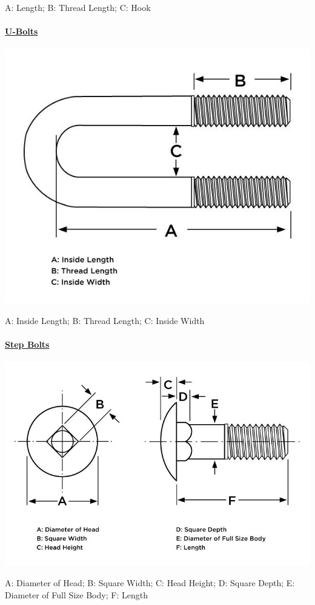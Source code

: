 \documentclass[12pt, a4paper]{article}
\let\oldparagraph\paragraph
\renewcommand{\paragraph}[1]{\oldparagraph{#1}\mbox{}}
\begin{document}
		\hypertarget{i9y9v8n}{}
		A: Length; B: Thread Length; C: Hook
		
		\hypertarget{iob5e0i}{}
		\hypertarget{in9zoqf}{%
			\paragraph{\texorpdfstring{\href{https://www.huyett.com/all-products/bolts/u-bolts}{U-Bolts}}{U-Bolts}}\label{in9zoqf}}
		
		\includegraphics{Introduction to Nut and Bolt Sizes_files/6307bd701bf44407484420.jpg}
		
		\hypertarget{iceu7t3}{}
		A: Inside Length; B: Thread Length; C: Inside Width
		
		\hypertarget{i6ize6}{}
		\hypertarget{ilxlvm}{%
			\paragraph{\texorpdfstring{\href{https://www.huyett.com/product/search?search=step\%20bolt}{Step
						Bolts}}{Step Bolts}}\label{ilxlvm}}
		
		\includegraphics{Introduction to Nut and Bolt Sizes_files/6307c769a225a243287054.jpg}
		
		\hypertarget{iba6cl}{}
		A: Diameter of Head; B: Square Width; C: Head Height; D: Square Depth;
		E: Diameter of Full Size Body; F: Length
		
		\hypertarget{irkmnp}{}
	
\end{document}
